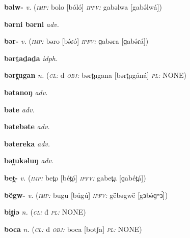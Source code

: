 \newentry
\headword\textbf{bəlw- }
\ipa{[bə́lw- ]}
\synpos\textit{v.} 
\imperative(\textit {\textsc{imp:}} bolo [bóló]
\imperfective\textit{\textsc{ipfv:}} gabəlwa [gabə́lwá])

\newentry
\headword\textbf{bərni bərni} 
\synpos\textit{adv.} 

\newentry
\headword\textbf{bər-}
\ipa{[bə́ɾ-]}
\synpos\textit{v.} 
\imperative(\textit {\textsc{imp:}} bəro [bə́ɾó] 
\imperfective\textit{\textsc{ipfv:}} ɡabəra [ɡabə́ɾá])

\newentry
\headword\textbf{bərṯaḏaḏa} 
\ipa{[bərṯaḏaḏa]} 
\synpos\textit{idph.} 

\newentry
\headword\textbf{bərt̪ugan} 
\synpos\textit{n.} 
\class(\textit{\textsc{cl:}} {đ}
\object\textit{\textsc{obj:}} bərt̪ugana [bərt̪ugáná]
\plural\textit{\textsc{pl:}} NONE)  

\newentry
\headword\textbf{bətanoŋ} 
\synpos\textit{adv.} 

\newentry
\headword\textbf{bəte} 
\ipa{[bəte]} 
\synpos\textit{adv.} 

\newentry
\headword\textbf{bətebəte} 
\ipa{[bətebəte]} 
\synpos\textit{adv.} 

\headword\textbf{bətereka} 
\ipa{[bətéréká]} 
\synpos\textit{adv.} 

\headword\textbf{bət̪ukəluŋ} 
\synpos\textit{adv.} 

\newentry
\headword\textbf{bet̪-}
\ipa{[bét̪-]}
\synpos\textit{v.} 
\imperative(\textit {\textsc{imp:}} bet̪o [bét̪ó] 
\imperfective\textit{\textsc{ipfv:}} gabet̪a [ɡabét̪á])

\newentry
\headword\textbf{bëgw-}
\ipa{[bɜ́gw-]}
\synpos\textit{v.} 
\imperative(\textit {\textsc{imp:}} bugu [búgú] 
\imperfective\textit{\textsc{ipfv:}} gëbəgwë [gɜbə́ɡʷɜ́])

\newentry
\headword\textbf{bit̪iə} 
\ipa{[bit̪iə]} 
\synpos\textit{n.} 
\class(\textit{\textsc{cl:}} {đ}
\plural\textit{\textsc{pl:}} NONE)  

\newentry
\headword\textbf{boca} 
\ipa{[botʃa]} 
\synpos\textit{n.} 
\class(\textit{\textsc{cl:}} {đ}
\object\textit{\textsc{obj:}} boca [botʃa]
\plural\textit{\textsc{pl:}} NONE)  


